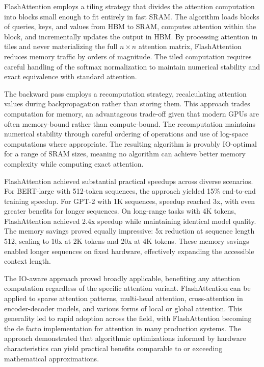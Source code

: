 FlashAttention employs a tiling strategy that divides the attention computation into blocks small enough to fit entirely in fast SRAM. The algorithm loads blocks of queries, keys, and values from HBM to SRAM, computes attention within the block, and incrementally updates the output in HBM. By processing attention in tiles and never materializing the full $n \times n$ attention matrix, FlashAttention reduces memory traffic by orders of magnitude. The tiled computation requires careful handling of the softmax normalization to maintain numerical stability and exact equivalence with standard attention.

The backward pass employs a recomputation strategy, recalculating attention values during backpropagation rather than storing them. This approach trades computation for memory, an advantageous trade-off given that modern GPUs are often memory-bound rather than compute-bound. The recomputation maintains numerical stability through careful ordering of operations and use of log-space computations where appropriate. The resulting algorithm is provably IO-optimal for a range of SRAM sizes, meaning no algorithm can achieve better memory complexity while computing exact attention.

FlashAttention achieved substantial practical speedups across diverse scenarios. For BERT-large with 512-token sequences, the approach yielded 15\% end-to-end training speedup. For GPT-2 with 1K sequences, speedup reached 3x, with even greater benefits for longer sequences. On long-range tasks with 4K tokens, FlashAttention achieved 2.4x speedup while maintaining identical model quality. The memory savings proved equally impressive: 5x reduction at sequence length 512, scaling to 10x at 2K tokens and 20x at 4K tokens. These memory savings enabled longer sequences on fixed hardware, effectively expanding the accessible context length.

The IO-aware approach proved broadly applicable, benefiting any attention computation regardless of the specific attention variant. FlashAttention can be applied to sparse attention patterns, multi-head attention, cross-attention in encoder-decoder models, and various forms of local or global attention. This generality led to rapid adoption across the field, with FlashAttention becoming the de facto implementation for attention in many production systems. The approach demonstrated that algorithmic optimizations informed by hardware characteristics can yield practical benefits comparable to or exceeding mathematical approximations.

